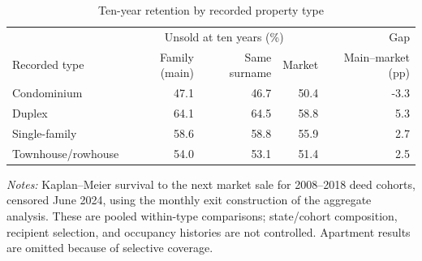 \begin{table}[!ht]\centering\small
\caption{Ten-year retention by recorded property type}
\label{tab:propertyretention}
\begin{tabular}{lrrrr}\toprule
 & \multicolumn{3}{c}{Unsold at ten years (\%)} & Gap \\
Recorded type & Family (main) & Same surname & Market & Main--market (pp) \\
\midrule
Condominium & 47.1 & 46.7 & 50.4 & -3.3 \\
Duplex & 64.1 & 64.5 & 58.8 & 5.3 \\
Single-family & 58.6 & 58.8 & 55.9 & 2.7 \\
Townhouse/rowhouse & 54.0 & 53.1 & 51.4 & 2.5 \\
\bottomrule\end{tabular}
\begin{minipage}{.95\linewidth}\footnotesize\textit{Notes:} Kaplan--Meier survival to the next market sale for 2008--2018 deed cohorts, censored June 2024, using the monthly exit construction of the aggregate analysis. These are pooled within-type comparisons; state/cohort composition, recipient selection, and occupancy histories are not controlled. Apartment results are omitted because of selective coverage.\end{minipage}
\end{table}
